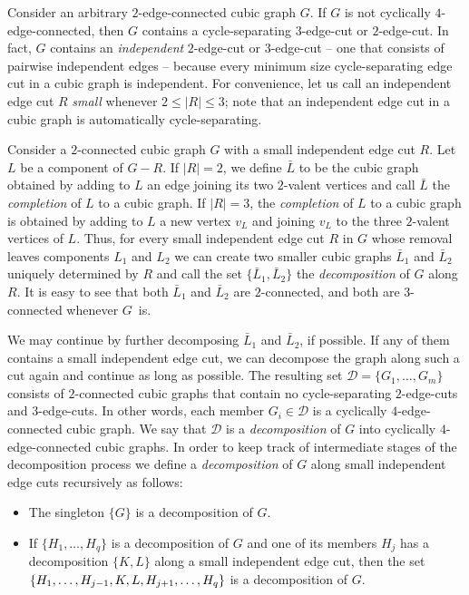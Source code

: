 \documentclass[a4paper]{amsart}
\theoremstyle{plain}
\theoremstyle{definition}
\begin{document}
Consider an arbitrary $2$-edge-connected cubic graph $G$. If
$G$ is not cyclically $4$-edge-connected, then $G$ contains a
cycle-separating $3$-edge-cut or $2$-edge-cut. In fact, $G$
contains an \emph{independent} $2$-edge-cut or $3$-edge-cut --
one that consists of pairwise independent edges -- because
every minimum size cycle-separating edge cut in a cubic graph
is independent. For convenience, let us call an independent
edge cut $R$ \emph{small} whenever $2\le |R|\le 3$; note that
an independent edge cut in a cubic graph is automatically
cycle-separating.

Consider a $2$-connected cubic graph $G$ with a small
independent edge cut $R$. Let $L$ be a component of $G-R$. If
$|R|=2$, we define $\bar L$ to be the cubic graph obtained by
adding to $L$ an edge joining its two $2$-valent vertices and
call $\bar L$ the \emph{completion} of $L$ to a cubic graph. If
$|R|=3$, the \emph{completion} of $L$ to a cubic graph is
obtained by adding to $L$ a new vertex $v_L$ and joining $v_L$
to the three $2$-valent vertices of $L$. Thus, for every small
independent edge cut $R$ in $G$ whose removal leaves components
$L_1$ and $L_2$ we can create two smaller cubic graphs $\bar
L_1$ and $\bar L_2$ uniquely determined by $R$ and call the set
$\{\bar L_1, \bar L_2\}$ the \emph{decomposition} of $G$
along~$R$. It is easy to see that both $\bar L_1$ and $\bar
L_2$ are $2$-connected, and both are $3$-connected whenever
$G$~is.

We may continue by further decomposing $\bar L_1$ and $\bar
L_2$, if possible. If any of them contains a small independent
edge cut, we can decompose the graph along such a cut again and
continue as long as possible. The resulting set
$\mathcal{D}=\{G_1,\ldots,G_m\}$ consists of $2$-connected
cubic graphs that contain no cycle-separating $2$-edge-cuts and
$3$-edge-cuts. In other words, each member $G_i\in\mathcal{D}$
is a cyclically $4$-edge-connected cubic graph. We say that
$\mathcal{D}$ is a \emph{decomposition} of $G$ into cyclically
$4$-edge-connected cubic graphs.
In order to keep track of intermediate stages of the
decomposition process we define a \emph{decomposition} of $G$
along small independent edge cuts recursively as follows:
\begin{itemize}
\item[(1)] The singleton $\{G\}$ is a decomposition of $G$.
\item[(2)] If $\{H_1,\ldots,H_q\}$ is a
    decomposition of $G$ and one of its members $H_j$ has a
    decomposition $\{K,L\}$ along a small independent
edge cut, then the set $\{H_1,\ldots, H_{j-1},\penalty0 K, L,    H_{j+1}, \ldots, H_q\}$ is a  decomposition of
    $G$.
\end{itemize}
\end{document}

